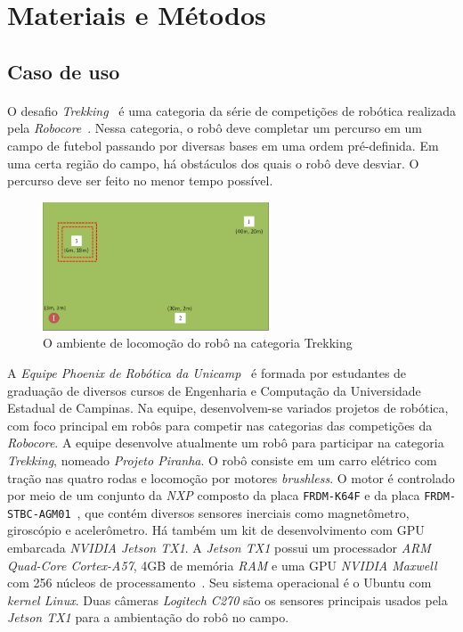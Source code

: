 \documentclass[11pt]{article}
\newcommand{\tit}[1]{\textit{#1}}
\newcommand{\ttt}[1]{\texttt{#1}}
\begin{document}
\section{Materiais e Métodos}
\subsection{Caso de uso}
\paragraph{}
O desafio \tit{Trekking}~\cite{trekking_regras} é uma categoria da série de 
competições de robótica realizada pela \tit{Robocore}~\cite{robocore}. 
Nessa categoria, o robô deve completar um percurso em 
um campo de futebol passando por diversas bases em uma ordem pré-definida.
Em uma certa região do campo, há obstáculos dos quais o robô deve desviar.
O percurso deve ser feito no menor tempo possível.

\begin{figure}[H]
  		\centering
    	\includegraphics[width=0.6\textwidth]{imgs/trekking_campo.png}
		\caption[9pt]{O ambiente de locomoção do robô na categoria Trekking}
\end{figure}

A \emph{Equipe Phoenix de Robótica da Unicamp}~\cite{phoenix} 
é formada por estudantes de graduação de diversos cursos de 
Engenharia e Computação da Universidade Estadual de Campinas. 
Na equipe, desenvolvem-se variados projetos de robótica,
com foco principal em robôs para competir nas categorias das competições da
\tit{Robocore}.  
A equipe desenvolve atualmente um robô para participar na categoria 
\tit{Trekking}, nomeado \tit{Projeto Piranha}. 
O robô consiste em um carro elétrico com tração nas quatro rodas e 
locomoção por motores \tit{brushless}.
O motor é controlado por meio de um conjunto da \tit{NXP} composto da placa
\ttt{FRDM-K64F} e da placa \ttt{FRDM-STBC-AGM01}~\cite{nxp}, que contém 
diversos sensores inerciais como magnetômetro, giroscópio e acelerômetro.
Há também um kit de desenvolvimento com GPU embarcada \tit{NVIDIA Jetson TX1}. 
A \tit{Jetson TX1} possui um processador \tit{ARM Quad-Core Cortex-A57},
4GB de memória \tit{RAM} e uma GPU \tit{NVIDIA Maxwell} com 256 núcleos de
processamento~\cite{tx1}. 
Seu sistema operacional é o Ubuntu com \tit{kernel Linux}.
Duas câmeras \tit{Logitech C270} são os sensores
principais usados pela \tit{Jetson TX1} para a ambientação do robô no campo.
\end{document}
